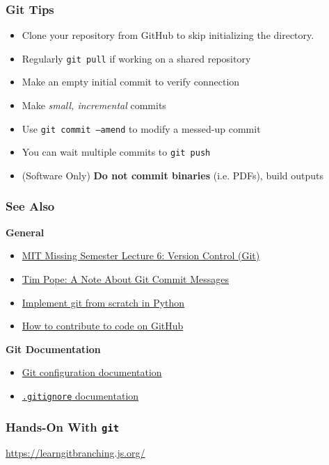 \documentclass[x11names]{beamer}                            %
\begin{document}
\begin{frame}
	\frametitle{Git Tips}
	\centering \textbf{}
	\begin{itemize}
		\item Clone your repository from GitHub to skip initializing the directory.
		\item Regularly \texttt{git pull} if working on a shared repository
		\item Make an empty initial commit to verify connection
		\item Make \textit{small, incremental} commits
		\item Use \texttt{git commit --amend} to modify a messed-up commit
		\item You can wait multiple commits to \texttt{git push}
		\item (Software Only) \textbf{Do not commit binaries} (i.e. PDFs), build outputs
	\end{itemize}
\end{frame}

\begin{frame}
	\frametitle{See Also}
	\centering \textbf{General}
	\begin{itemize}
		\setlength\itemsep{1em}
		\item \href{https://missing.csail.mit.edu/2020/version-control/}{MIT Missing Semester Lecture 6: Version Control (Git)}
		\item \href{https://tbaggery.com/2008/04/19/a-note-about-git-commit-messages.html}{Tim Pope: A Note About Git Commit Messages}
		\item \href{https://wyag.thb.lt/}{Implement git from scratch in Python}
		\item
		      \href{https://docs.github.com/en/free-pro-team@latest/github/collaborating-with-issues-and-pull-requests/about-pull-requests}{How to contribute to code on GitHub}
	\end{itemize}
	\vfill
	\centering \textbf{Git Documentation}
	\begin{itemize}
		\item \href{https://git-scm.com/docs/git-config}{Git configuration documentation}
		\item \href{https://git-scm.com/docs/gitignore}{\texttt{.gitignore} documentation}
	\end{itemize}
\end{frame}

\begin{frame}
	\frametitle{Hands-On With \texttt{git}}
	\centering
	\large{\url{https://learngitbranching.js.org/}}
\end{frame}
\end{document}
